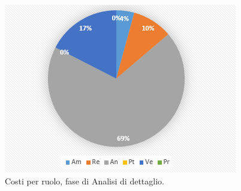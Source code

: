 \documentclass[a4paper]{report}
\begin{document}
			\begin{figure}[H]
				\centering
				\includegraphics[scale=0.7]{PCCostiDettaglio}
				\caption{Costi per ruolo, fase di Analisi di dettaglio.}
			\end{figure}
\end{document}
